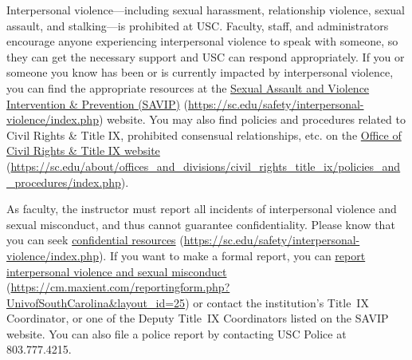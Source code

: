 \documentclass[11pt,letterpaper]{article}
\begin{document}

Interpersonal violence---including sexual harassment, relationship violence, sexual assault, and stalking---is prohibited at USC. Faculty, staff, and administrators encourage anyone experiencing interpersonal violence to speak with someone, so they can get the necessary support and USC can respond appropriately. If you or someone you know has been or is currently impacted by interpersonal violence, you can find the appropriate resources at the \href{https://sc.edu/safety/interpersonal-violence/index.php}{Sexual Assault and Violence Intervention \& Prevention (SAVIP)} (\url{https://sc.edu/safety/interpersonal-violence/index.php}) website. You may also find policies and procedures related to Civil Rights \& Title IX, prohibited consensual relationships, etc. on the \href{https://sc.edu/about/offices\_and\_divisions/civil\_rights\_title\_ix/policies\_and\_procedures/index.php}{Office of Civil Rights \& Title IX website} (\url{https://sc.edu/about/offices\_and\_divisions/civil\_rights\_title\_ix/policies\_and\_procedures/index.php}). \pspace

As faculty, the instructor must report all incidents of interpersonal violence and sexual misconduct, and thus cannot guarantee confidentiality. Please know that you can seek \href{https://sc.edu/safety/interpersonal-violence/index.php}{confidential resources} (\url{https://sc.edu/safety/interpersonal-violence/index.php}). If you want to make a formal report, you can \href{https://cm.maxient.com/reportingform.php?UnivofSouthCarolina\&layout\_id=25}{report interpersonal violence and sexual misconduct} (\url{https://cm.maxient.com/reportingform.php?UnivofSouthCarolina\&layout\_id=25}) or contact the institution's Title~IX Coordinator, or one of the Deputy Title~IX Coordinators listed on the SAVIP website. You can also file a police report by contacting USC Police at 803.777.4215. \sectionbreak



\end{document}
